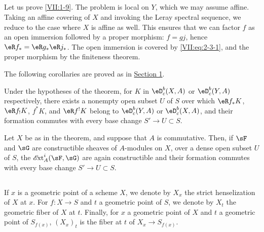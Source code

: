 \subsection{}\label{VII:2-8}

Let us prove \ref{VII:1-9}. The problem is local on $Y$, which we may assume
affine. Taking an affine covering of $X$ and invoking the Leray spectral
sequence, we reduce to the case where $X$ is affine as well. This ensures that
we can factor $f$ as an open immersion followed by a proper morphism:
$f=g j$, hence $\eR f_\ast = \eR g_\ast \eR j_\ast$. The open immersion is
covered by \eqref{VII:eq:2-3-1}, and the proper morphism by the finiteness
theorem.

The following corollaries are proved as in \hyperref[VII:1]{Section 1}.





\begin{corollary_}\label{VII:2-9}
Under the hypotheses of the theorem, for $K$ in $\eD_c^b(X,A)$ or
$\eD_c^b(Y,A)$ respectively, there exists a nonempty open subset $U$ of $S$
over which $\eR f_\ast K$, $\eR f_! K$, $f^\ast K$, and $\eR f^! K$ belong to
$\eD_c^b(Y,A)$ or $\eD_c^b(X,A)$, and their formation commutes with every base
change $S' \to U\subset S$.
\end{corollary_}





\begin{corollary_}\label{VII:2-10}
Let $X$ be as in the theorem, and suppose that $A$ is commutative. Then, if
$\sF$ and $\sG$ are constructible sheaves of $A$-modules on $X$, over a dense
open subset $U$ of $S$, the $\Ext_A^i(\sF,\sG)$ are again constructible and
their formation commutes with every base change $S' \to U\subset S$.
\end{corollary_}





\subsection{}\label{VII:2-11}

If $x$ is a geometric point of a scheme $X$, we denote by $X_x$ the strict
henselization of $X$ at $x$. For $f:X\to S$ and $t$ a geometric point of $S$,
we denote by $X_t$ the geometric fiber of $X$ at $t$. Finally, for $x$ a
geometric point of $X$ and $t$ a geometric point of $S_{f(x)}$, $(X_x)_t$ is
the fiber at $t$ of $X_x \to S_{f(x)}$.





